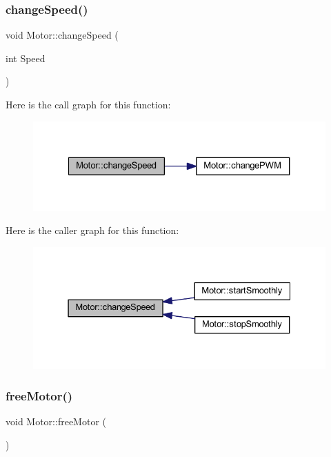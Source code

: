 \subsubsection{\texorpdfstring{change\+Speed()}{changeSpeed()}}
{\footnotesize\ttfamily void Motor\+::change\+Speed (\begin{DoxyParamCaption}\item[{int}]{Speed }\end{DoxyParamCaption})}

Here is the call graph for this function\+:
\nopagebreak
\begin{figure}[H]
\begin{center}
\leavevmode
\includegraphics[width=327pt]{d1/d6b/class_motor_a6b966366a7a184ae6b3c3227f5d57213_cgraph}
\end{center}
\end{figure}
Here is the caller graph for this function\+:
\nopagebreak
\begin{figure}[H]
\begin{center}
\leavevmode
\includegraphics[width=331pt]{d1/d6b/class_motor_a6b966366a7a184ae6b3c3227f5d57213_icgraph}
\end{center}
\end{figure}
\mbox{\label{class_motor_a76845764c398bb11a880080b010e6119}} 
\subsubsection{\texorpdfstring{free\+Motor()}{freeMotor()}}
{\footnotesize\ttfamily void Motor\+::free\+Motor (\begin{DoxyParamCaption}{ }\end{DoxyParamCaption})}

